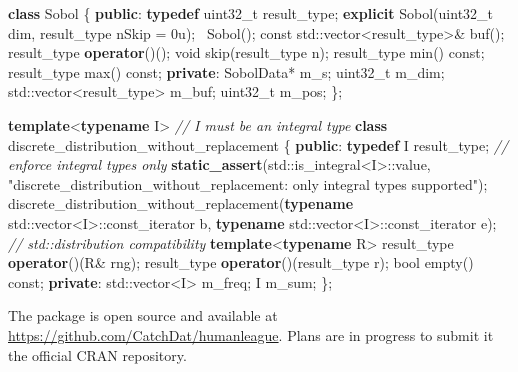 \documentclass[]{article}
\newenvironment{Shaded}{\begin{snugshade}}{\end{snugshade}}
\newcommand{\KeywordTok}[1]{\textcolor[rgb]{0.13,0.29,0.53}{\textbf{{#1}}}}
\newcommand{\DataTypeTok}[1]{\textcolor[rgb]{0.13,0.29,0.53}{{#1}}}
\newcommand{\DecValTok}[1]{\textcolor[rgb]{0.00,0.00,0.81}{{#1}}}
\newcommand{\StringTok}[1]{\textcolor[rgb]{0.31,0.60,0.02}{{#1}}}
\newcommand{\CommentTok}[1]{\textcolor[rgb]{0.56,0.35,0.01}{\textit{{#1}}}}
\newcommand{\NormalTok}[1]{{#1}}
\begin{document}
\begin{Shaded}
\begin{Highlighting}[]
  \KeywordTok{class} \NormalTok{Sobol}
  \NormalTok{\{}
  \KeywordTok{public}\NormalTok{:}
    \KeywordTok{typedef} \DataTypeTok{uint32_t} \NormalTok{result_type;}
    \KeywordTok{explicit} \NormalTok{Sobol(}\DataTypeTok{uint32_t} \NormalTok{dim, result_type nSkip = }\DecValTok{0u}\NormalTok{);}
    \NormalTok{~Sobol();}
    \DataTypeTok{const} \NormalTok{std::vector<result_type>& buf();}
    \NormalTok{result_type }\KeywordTok{operator}\NormalTok{()();}
    \DataTypeTok{void} \NormalTok{skip(result_type n);}
    \NormalTok{result_type min() }\DataTypeTok{const}\NormalTok{;}
    \NormalTok{result_type max() }\DataTypeTok{const}\NormalTok{;}
  \KeywordTok{private}\NormalTok{:}
    \NormalTok{SobolData* m_s;}
    \DataTypeTok{uint32_t} \NormalTok{m_dim;}
    \NormalTok{std::vector<result_type> m_buf;}
    \DataTypeTok{uint32_t} \NormalTok{m_pos;}
  \NormalTok{\};}

  \KeywordTok{template}\NormalTok{<}\KeywordTok{typename} \NormalTok{I> }\CommentTok{// I must be an integral type}
  \KeywordTok{class} \NormalTok{discrete_distribution_without_replacement}
  \NormalTok{\{}
  \KeywordTok{public}\NormalTok{:}
    \KeywordTok{typedef} \NormalTok{I result_type;}
    \CommentTok{// enforce integral types only}
    \KeywordTok{static_assert}\NormalTok{(std::is_integral<I>::value, }
      \StringTok{"discrete_distribution_without_replacement: only integral types supported"}\NormalTok{);}
    \NormalTok{discrete_distribution_without_replacement(}\KeywordTok{typename} \NormalTok{std::vector<I>::const_iterator b, }
                                              \KeywordTok{typename} \NormalTok{std::vector<I>::const_iterator e);}
    \CommentTok{// std::distribution compatibility}
    \KeywordTok{template}\NormalTok{<}\KeywordTok{typename} \NormalTok{R>}
    \NormalTok{result_type }\KeywordTok{operator}\NormalTok{()(R& rng);}
    \NormalTok{result_type }\KeywordTok{operator}\NormalTok{()(result_type r);}
    \DataTypeTok{bool} \NormalTok{empty() }\DataTypeTok{const}\NormalTok{;}
  \KeywordTok{private}\NormalTok{:}
    \NormalTok{std::vector<I> m_freq;}
    \NormalTok{I m_sum;}
  \NormalTok{\};}
\end{Highlighting}
\end{Shaded}

The package is open source and available at
\url{https://github.com/CatchDat/humanleague}. Plans are in progress to
submit it the official CRAN repository.
\end{document}
